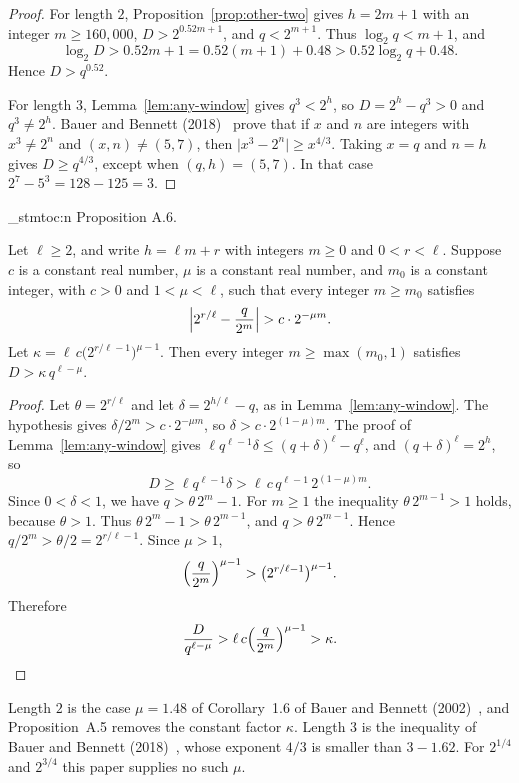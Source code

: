 \documentclass[11pt]{article}
\newenvironment{named}[1]{%
  \par\addvspace{\medskipamount}%
  \pagebreak[3]%
  \noindent{\bfseries #1}\space\ignorespaces
  \stmtoc{#1}%
}{\par\addvspace{\medskipamount}}
\newcommand{\stmtoc}[1]{ \qn_stmtoc:n {#1} }
\begin{document}
\begin{proof}
For length $2$, Proposition~\ref{prop:other-two} gives $h = 2m + 1$ with an integer $m \ge 160{,}000$, $D > 2^{0.52 m + 1}$, and $q < 2^{m+1}$.
Thus $\log_2 q < m + 1$, and
\[
\log_2 D > 0.52 m + 1 = 0.52(m + 1) + 0.48 > 0.52\log_2 q + 0.48.
\]
Hence $D > q^{0.52}$.

For length $3$, Lemma~\ref{lem:any-window} gives $q^3 < 2^h$, so $D = 2^h - q^3 > 0$ and $q^3 \ne 2^h$.
Bauer and Bennett (2018)~\cite{bauer-bennett-2018} prove that if $x$ and $n$ are integers with $x^3 \ne 2^n$ and $(x, n) \ne (5, 7)$, then $\lvert x^3 - 2^n \rvert \ge x^{4/3}$.
Taking $x = q$ and $n = h$ gives $D \ge q^{4/3}$, except when $(q, h) = (5, 7)$.
In that case $2^7 - 5^3 = 128 - 125 = 3$.
\end{proof}

\begin{named}{Proposition A.6.}
Let $\ell \ge 2$, and write $h = \ell m + r$ with integers $m \ge 0$ and $0 < r < \ell$.
Suppose $c$ is a constant real number, $\mu$ is a constant real number, and $m_0$ is a constant integer, with $c > 0$ and $1 < \mu < \ell$, such that every integer $m \ge m_0$ satisfies
\[
\Bigl| 2^{r/\ell} - \frac{q}{2^m} \Bigr| > c \cdot 2^{-\mu m}.
\]
Let $\kappa = \ell\, c \bigl(2^{r/\ell - 1}\bigr)^{\mu - 1}$.
Then every integer $m \ge \max(m_0, 1)$ satisfies $D > \kappa\, q^{\ell - \mu}$.
\end{named}

\begin{proof}
Let $\theta = 2^{r/\ell}$ and let $\delta = 2^{h/\ell} - q$, as in Lemma~\ref{lem:any-window}.
The hypothesis gives $\delta/2^m > c \cdot 2^{-\mu m}$, so $\delta > c \cdot 2^{(1-\mu)m}$.
The proof of Lemma~\ref{lem:any-window} gives $\ell q^{\ell-1}\delta \le (q+\delta)^\ell - q^\ell$, and $(q+\delta)^\ell = 2^h$, so
\[
D \ge \ell q^{\ell-1}\delta > \ell\, c\, q^{\ell-1}\, 2^{(1-\mu)m}.
\]
Since $0 < \delta < 1$, we have $q > \theta\, 2^m - 1$.
For $m \ge 1$ the inequality $\theta\, 2^{m-1} > 1$ holds, because $\theta > 1$.
Thus $\theta\, 2^m - 1 > \theta\, 2^{m-1}$, and $q > \theta\, 2^{m-1}$.
Hence $q/2^m > \theta/2 = 2^{r/\ell - 1}$.
Since $\mu > 1$,
\[
\Bigl(\frac{q}{2^m}\Bigr)^{\mu-1} > \bigl(2^{r/\ell - 1}\bigr)^{\mu-1}.
\]
Therefore
\[
\frac{D}{q^{\ell-\mu}} > \ell\, c \Bigl(\frac{q}{2^m}\Bigr)^{\mu-1} > \kappa.
\]
\end{proof}

Length $2$ is the case $\mu = 1.48$ of Corollary~1.6 of Bauer and Bennett (2002)~\cite{bauer-bennett-2002}, and Proposition~A.5 removes the constant factor $\kappa$.
Length $3$ is the inequality of Bauer and Bennett (2018)~\cite{bauer-bennett-2018}, whose exponent $4/3$ is smaller than $3 - 1.62$.
For $2^{1/4}$ and $2^{3/4}$ this paper supplies no such $\mu$.
\end{document}
